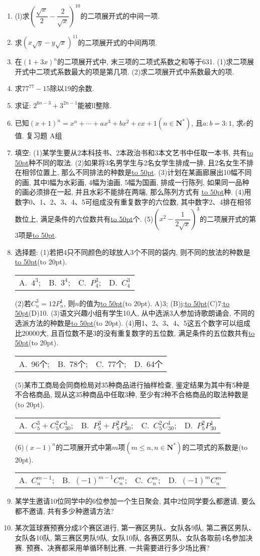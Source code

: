 \documentclass[10pt,a4paper]{article}
\newcommand{\blank}[1]{\underline{\hbox to #1pt{}}}
\newcommand{\bracket}[1]{(\hbox to #1pt{})}
\newcommand{\fourch}[4]{\par\begin{tabular}{p{.23\textwidth}p{.23\textwidth}p{.23\textwidth}p{.23\textwidth}}
A.~#1 &B.~#2& C.~#3& D.~#4
\end{tabular}}
\begin{document}
\begin{enumerate}[1.]
$C_{100}^0-C_{100}^2+C_{100}^4-\cdots +C_{100}^{98}+C_{100}^{100}$等于\blank{50}\bracket{20}.
\fourch{$-2^{50}$;}{0;}{1;}{$2^{50}$}
\item (l)求$(\dfrac{\sqrt x}2-\dfrac 2{\sqrt x})^{10}$的二项展开式的中间一项.
\item 求$(x\sqrt y-y\sqrt x)^{11}$的二项展开式的中间两项.
\item 在$(1+3x)^n$的二项展开式中, 末三项的二项式系数之和等于631.
(1)求二项展开式中二项式系数最大的项是第几项.
(2)求二项展开式中系数最大的项.
\item 求$77^{77}-15$除以19的余数.
\item 求证: $2^{6n-3}+3^{2n-1}$能被ll整除.
\item 已知$(x+1)^n=x^n+\cdots +ax^3+bx^2+cx+1(n\in \mathbf{N}^*)$, 且$a:b=3:1$, 求$c$的值.
复习题
A组
\item 填空:
(1)某学生要从2本科技书、2本政治书和3本文艺书中任取一本书, 共有\blank{50}种不同的取法.
(2)如果将3名男学生与2名女学生排成一排, 且2名女生不排在相邻位置上, 那么不同排法的种数是\blank{50}.
(3)计划在某画廊展出10幅不同的画, 其中l幅为水彩画, 4幅为油画, 5幅为国画, 排成一行陈列, 如果同一品种的画必须排在一起, 并且水彩不能排在两端, 那么陈列方式有	\blank{50}种.
(4)用数字0、1、2、3、4、5可组成没有重复数字的六位数, 其中数字2、4排在相邻数位上, 满足条件的六位数共有\blank{50}个.
(5)$(x^2-\dfrac 1{2\sqrt x})^3$的二项展开式的第3项是\blank{50}.
\item 选择题:
(1)若把4只不同颜色的球放人3个不同的袋内, 则不同的放法的种数是\blank{50}\bracket{20}.
\fourch{$4^3$;}{$3^4$;}{$P_4^3$;}{$C_4^3$}
(2)若$C_n^3=12P_n^1$, 则$n$的值为\blank{50}\bracket{20}.
A)3;    (B)j;\blank{50}(C)7;\blank{50}(D)10.
(3)语文兴趣小组有学生10人, 从中选派3人参加诗歌朗诵会, 不同的选派方法的种数是\blank{50}\bracket{20}.
(4)用1、2、3、4、5这五个数字可以组成比20000大, 且百位数不是3的没有重复数字的五位数, 满足条件的五位数共有\blank{50}\bracket{20}.
    \fourch{96个;}{78个;}{77个;}{64个}
(5)某市工商局会同商检局对35种商品进行抽样检查, 鉴定结果为其中有5种是不合格商品, 现从这35种商品中任取3种, 至少有2种不合格商品的取法种数是\bracket{20}.
\fourch{$C_5^3+C_5^2C_{30}^1$;}{$P_5^3+P_5^2P_{30}^1$;}{$C_5^2C_{30}^1$;}{$P_5^2P_{30}^1$}
(6)$(x-1)^n$的二项展开式中第$m$项$(m\le n,n\in \mathbf{N}^*)$的二项式的系数是\bracket{20}.
\fourch{$C_n^{m-1}$;}{$(-1)^{m-1}C_n^m$;}{$C_n^m$;}{$(-1)^mC_n^m$}
\item 某学生邀请10位同学中的6位参加一个生日聚会, 其中2位同学要么都邀请, 要么都不邀请, 共有多少种邀请方法?
\item 某次篮球赛预赛分成3个赛区进行, 第一赛区男队、女队各9队, 第二赛区男队、女队各10队, 第三赛区男队9队, 女队10队, 各赛区男队、女队各取前4名参加决赛. 预赛、决赛都采用单循环制比赛, 一共需要进行多少场比赛?

\end{enumerate}
\end{document}
